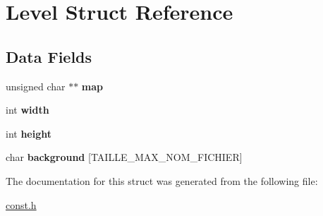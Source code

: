 \hypertarget{struct_level}{\section{Level Struct Reference}
\label{struct_level}
}
\subsection*{Data Fields}
\begin{DoxyCompactItemize}
\item 
\hypertarget{struct_level_a6d985f8729c187f1c35dabba2738f0bd}{unsigned char $\ast$$\ast$ {\bfseries map}}\label{struct_level_a6d985f8729c187f1c35dabba2738f0bd}

\item 
\hypertarget{struct_level_a2474a5474cbff19523a51eb1de01cda4}{int {\bfseries width}}\label{struct_level_a2474a5474cbff19523a51eb1de01cda4}

\item 
\hypertarget{struct_level_ad12fc34ce789bce6c8a05d8a17138534}{int {\bfseries height}}\label{struct_level_ad12fc34ce789bce6c8a05d8a17138534}

\item 
\hypertarget{struct_level_a9105c37f5522780c25319a1f3e2b567e}{char {\bfseries background} \mbox{[}T\-A\-I\-L\-L\-E\-\_\-\-M\-A\-X\-\_\-\-N\-O\-M\-\_\-\-F\-I\-C\-H\-I\-E\-R\mbox{]}}\label{struct_level_a9105c37f5522780c25319a1f3e2b567e}

\end{DoxyCompactItemize}


The documentation for this struct was generated from the following file\-:\begin{DoxyCompactItemize}
\item 
\hyperlink{const_8h}{const.\-h}\end{DoxyCompactItemize}
